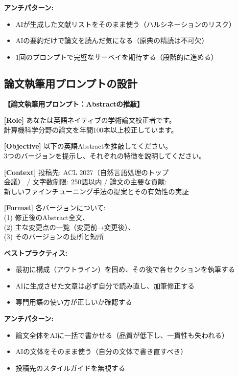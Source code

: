 \textbf{アンチパターン:}
\begin{itemize}
\item AIが生成した文献リストをそのまま使う（ハルシネーションのリスク）
\item AIの要約だけで論文を読んだ気になる（原典の精読は不可欠）
\item 1回のプロンプトで完璧なサーベイを期待する（段階的に進める）
\end{itemize}

\subsection{論文執筆用プロンプトの設計}

\begin{promptbox}
\textbf{【論文執筆用プロンプト：Abstractの推敲】}

\textbf{[Role]} あなたは英語ネイティブの学術論文校正者です。\\
計算機科学分野の論文を年間100本以上校正しています。

\textbf{[Objective]} 以下の英語Abstractを推敲してください。\\
3つのバージョンを提示し、それぞれの特徴を説明してください。

\textbf{[Context]} 投稿先: ACL 2027（自然言語処理のトップ\\
会議） / 文字数制限: 250語以内 / 論文の主要な貢献:\\
新しいファインチューニング手法の提案とその有効性の実証

\textbf{[Format]} 各バージョンについて:\\
(1) 修正後のAbstract全文、\\
(2) 主な変更点の一覧（変更前→変更後）、\\
(3) そのバージョンの長所と短所
\end{promptbox}

\textbf{ベストプラクティス:}
\begin{itemize}
\item 最初に構成（アウトライン）を固め、その後で各セクションを執筆する
\item AIに生成させた文章は必ず自分で読み直し、加筆修正する
\item 専門用語の使い方が正しいか確認する
\end{itemize}

\textbf{アンチパターン:}
\begin{itemize}
\item 論文全体をAIに一括で書かせる（品質が低下し、一貫性も失われる）
\item AIの文体をそのまま使う（自分の文体で書き直すべき）
\item 投稿先のスタイルガイドを無視する
\end{itemize}

